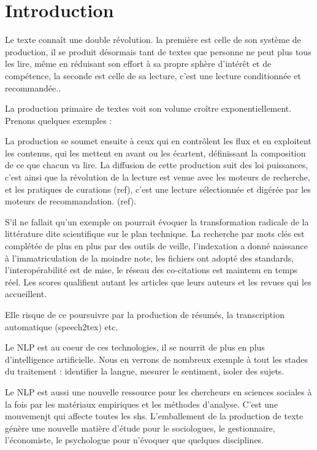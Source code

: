 \documentclass[
]{book}
\begin{document}
\hypertarget{intro}{%
\chapter{Introduction}\label{intro}}

Le texte connaît une double révolution. la première est celle de son système de production, il se produit désormais tant de textes que personne ne peut plus tous les lire, même en réduisant son effort à sa propre sphère d'intérêt et de compétence, la seconde est celle de sa lecture, c'est une lecture conditionnée et recommandée..

La production primaire de textes voit son volume croître exponentiellement. Prenons quelques exemples :

La production se soumet ensuite à ceux qui en contrôlent les flux et en exploitent les contenus, qui les mettent en avant ou les écartent, définissant la composition de ce que chacun va lire. La diffusion de cette production suit des loi puissances, c'est ainsi que la révolution de la lecture est venue avec les moteurs de recherche, et les pratiques de curations (ref), c'est une lecture sélectionnée et digérée par les moteurs de recommandation. (ref).

S'il ne fallait qu'un exemple on pourrait évoquer la transformation radicale de la littérature dite scientifique sur le plan technique. La recherche par mots clés est complétée de plus en plus par des outils de veille, l'indexation a donné naissance à l'immatriculation de la moindre note, les fichiers ont adopté des standards, l'interopérabilité est de mise, le réseau des co-citations est maintenu en temps réel. Les scores qualifient autant les articles que leurs auteurs et les revues qui les accueillent.

Elle risque de ce poursuivre par la production de résumés, la transcription automatique (speech2tex) etc.

Le NLP est au coeur de ces technologies, il se nourrit de plus en plus d'intelligence artificielle. Nous en verrons de nombreux exemple à tout les stades du traitement : identifier la langue, mesurer le sentiment, isoler des sujets.

Le NLP est aussi une nouvelle ressource pour les chercheurs en sciences sociales à la fois par les matériaux empiriques et les méthodes d'analyse. C'est une mouvemenjt qui affecte toutes les shs. L'emballement de la production de texte génère une nouvelle matière d'étude pour le sociologues, le gestionnaire, l'économiste, le psychologue pour n'évoquer que quelques disciplines.
\end{document}
